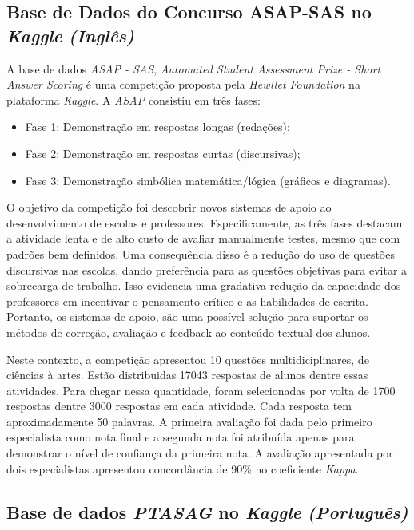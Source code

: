 \subsection{Base de Dados do Concurso ASAP-SAS no \textit{Kaggle} \textit{(Inglês)}}
\label{kaggle-db}

A base de dados \textit{ASAP - SAS}, \textit{Automated Student Assessment Prize - Short Answer Scoring} é uma competição proposta pela \textit{Hewllet Foundation} na plataforma \textit{Kaggle}. A \textit{ASAP} consistiu em três fases:

\begin{itemize}
\item Fase 1:  Demonstração em respostas longas (redações); 
\item Fase 2:  Demonstração em respostas curtas (discursivas);
\item Fase 3:  Demonstração simbólica matemática/lógica (gráficos e diagramas).
\end{itemize}

O objetivo da competição foi descobrir novos sistemas de apoio ao desenvolvimento de escolas e professores. Especificamente, as três fases destacam a atividade lenta e de alto custo de avaliar manualmente testes, mesmo que com padrões bem definidos. Uma consequência disso é a redução do uso de questões discursivas nas escolas, dando preferência para as questões objetivas para evitar a sobrecarga de trabalho. Isso evidencia uma gradativa redução da capacidade dos professores em incentivar o pensamento crítico e as habilidades de escrita. Portanto, os sistemas de apoio, são uma possível solução para suportar os métodos de correção, avaliação e feedback ao conteúdo textual dos alunos.

Neste contexto, a competição apresentou 10 questões multidiciplinares, de ciências à artes. Estão distribuidas 17043 respostas de alunos dentre essas atividades. Para chegar nessa quantidade, foram selecionadas por volta de 1700 respostas dentre 3000 respostas em cada atividade. Cada resposta tem aproximadamente 50 palavras. A primeira avaliação foi dada pelo primeiro especialista como nota final e a segunda nota foi atribuída apenas para demonstrar o nível de confiança da primeira nota. A avaliação apresentada por dois especialistas apresentou concordância de 90\% no coeficiente \textit{Kappa}.

\subsection{Base de dados \textit{PTASAG} no \textit{Kaggle} \textit{(Português)}}
\label{ptasag-db}

